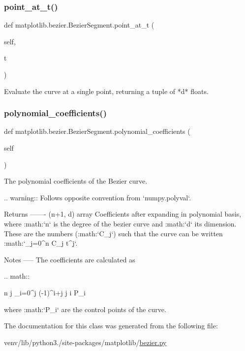 \subsubsection{\texorpdfstring{point\+\_\+at\+\_\+t()}{point\_at\_t()}}
{\footnotesize\ttfamily def matplotlib.\+bezier.\+Bezier\+Segment.\+point\+\_\+at\+\_\+t (\begin{DoxyParamCaption}\item[{}]{self,  }\item[{}]{t }\end{DoxyParamCaption})}

\begin{DoxyVerb}Evaluate the curve at a single point, returning a tuple of *d* floats.
\end{DoxyVerb}
 \mbox{\label{classmatplotlib_1_1bezier_1_1BezierSegment_a6a13b2b879af5d5622c71bf197846351}} 
\subsubsection{\texorpdfstring{polynomial\+\_\+coefficients()}{polynomial\_coefficients()}}
{\footnotesize\ttfamily def matplotlib.\+bezier.\+Bezier\+Segment.\+polynomial\+\_\+coefficients (\begin{DoxyParamCaption}\item[{}]{self }\end{DoxyParamCaption})}

\begin{DoxyVerb}The polynomial coefficients of the Bezier curve.

.. warning:: Follows opposite convention from `numpy.polyval`.

Returns
-------
(n+1, d) array
    Coefficients after expanding in polynomial basis, where :math:`n`
    is the degree of the bezier curve and :math:`d` its dimension.
    These are the numbers (:math:`C_j`) such that the curve can be
    written :math:`\sum_{j=0}^n C_j t^j`.

Notes
-----
The coefficients are calculated as

.. math::

    {n \choose j} \sum_{i=0}^j (-1)^{i+j} {j \choose i} P_i

where :math:`P_i` are the control points of the curve.
\end{DoxyVerb}
 

The documentation for this class was generated from the following file\+:\begin{DoxyCompactItemize}
\item 
venv/lib/python3./site-\/packages/matplotlib/\hyperlink{bezier_8py}{bezier.\+py}\end{DoxyCompactItemize}
